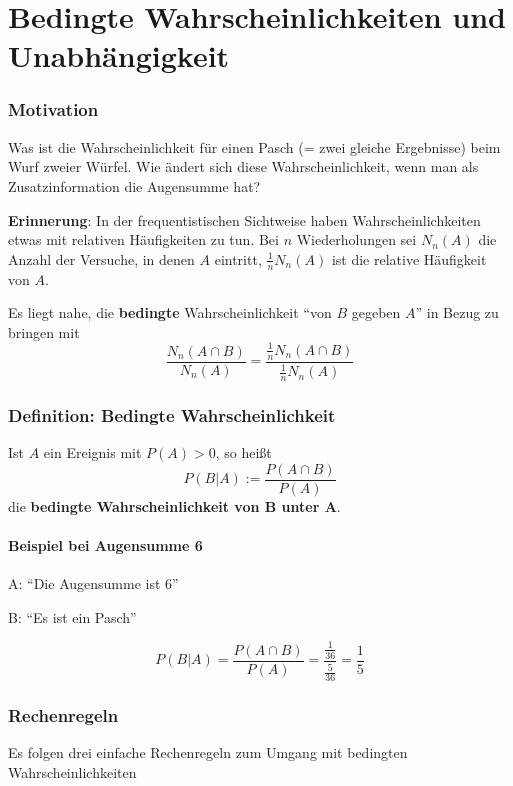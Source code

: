 \part{Bedingte Wahrscheinlichkeiten und Unabhängigkeit}

\section{Motivation}
Was ist die Wahrscheinlichkeit für einen Pasch (= zwei gleiche Ergebnisse) beim Wurf zweier Würfel.
Wie ändert sich diese Wahrscheinlichkeit, wenn man als Zusatzinformation die Augensumme hat?

\textbf{Erinnerung}:
In der frequentistischen Sichtweise haben Wahrscheinlichkeiten etwas mit relativen Häufigkeiten zu tun.
Bei $n$ Wiederholungen sei $N_n(A)$ die Anzahl der Versuche, in denen $A$ eintritt, $ \frac{1}{n}N_n(A) $ ist die relative Häufigkeit von $A$.

Es liegt nahe, die \textbf{bedingte} Wahrscheinlichkeit ``von $B$ gegeben $A$'' in Bezug zu bringen mit
\[
	\frac{N_n(A\cap B)}{N_n(A)} = \frac{\frac{1}{n}N_n(A\cap B)}{\frac{1}{n}N_n(A)}
\]

\section{Definition: Bedingte Wahrscheinlichkeit}

Ist $A$ ein Ereignis mit $P(A)>0$, so heißt
\begin{equation}
	P(B|A) := \frac{P(A \cap B)}{P(A)}
\end{equation}
die \textbf{bedingte Wahrscheinlichkeit von B unter A}.

\subsection{Beispiel bei Augensumme 6}

A: ``Die Augensumme ist 6''

B: ``Es ist ein Pasch''

\[
	P(B|A) = \frac{P(A \cap B)}{P(A)} = \frac{ \frac{1}{36} }{ \frac{5}{36} } = \frac{1}{5}
\]

\section{Rechenregeln}

Es folgen drei einfache Rechenregeln zum Umgang mit bedingten Wahrscheinlichkeiten

